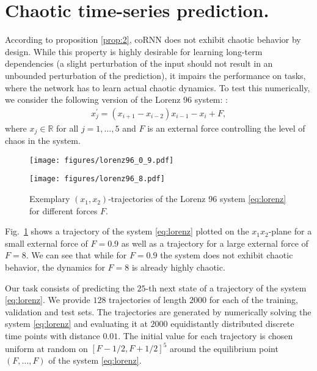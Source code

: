 \documentclass{article} \usepackage{iclr2021_conference,times}
\newcommand{\fref}[1] {Fig.~\ref{#1}}
\begin{document}
\section{Chaotic time-series prediction.}
\label{sec:ctsp}
According to proposition \ref{prop:2}, coRNN does not exhibit chaotic behavior by design. While this property is highly desirable for learning long-term dependencies (a slight perturbation of the input should not result in an unbounded perturbation of the prediction), it impairs the performance on tasks, where the network has to learn actual chaotic dynamics. To test this numerically, we consider the following version of the Lorenz 96 system: \citep{lorenz96}:
\begin{align}
\label{eq:lorenz}
    x^\prime_j = (x_{i+1} - x_{i-2})x_{i-1} - x_i + F,
\end{align}
where $x_j\in \mathbb{R}$ for all $j=1,\dots,5$ and $F$ is an external force controlling the level of chaos in the system.
\begin{figure}[ht!]
\centering
\begin{minipage}[t]{0.49\textwidth}	
\texttt{[image: figures/lorenz96\_0\_9.pdf]}
\end{minipage}\hspace{0.01\textwidth}
\begin{minipage}[t]{.49\textwidth}
\texttt{[image: figures/lorenz96\_8.pdf]}
\end{minipage}
\caption{Exemplary $(x_1,x_2)$-trajectories of the Lorenz 96 system \eqref{eq:lorenz} for different forces $F$.}
\label{fig:lorenz}
\end{figure}
\fref{fig:lorenz} shows a trajectory of the system \eqref{eq:lorenz} plotted on the $x_1x_2$-plane for a small external force of $F=0.9$ as well as a trajectory for a large external force of $F=8$. We can see that while for $F=0.9$ the system does not exhibit chaotic behavior, the dynamics for $F=8$ is already highly chaotic.

Our task consists of predicting the $25$-th next state of a trajectory of the system \eqref{eq:lorenz}. 
We provide $128$ trajectories of length $2000$ for each of the training, validation and test sets. The trajectories are generated by numerically solving the system \eqref{eq:lorenz} and evaluating it at $2000$ equidistantly distributed discrete time points with distance $0.01$. The initial value for each trajectory is chosen uniform at random on $[F-1/2,F+1/2]^5$ around the equilibrium point $(F,\dots,F)$ of the system \eqref{eq:lorenz}. 
\end{document}

